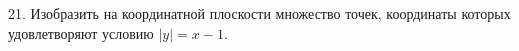 21. Изобразить на координатной плоскости множество точек, координаты которых удовлетворяют условию $|y|=x-1.$\\
